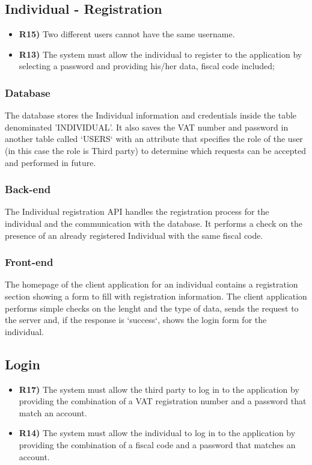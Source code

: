 \subsection{Individual - Registration}
\begin{itemize}
	\item {\color{Green}\textbf{R15)}} Two different users cannot have the same username.
	\item {\color{Green}\textbf{R13)}} The system must allow the individual to register to the application by selecting a password and providing his/her data, fiscal code included;
\end{itemize}

\subsubsection*{Database}
The database stores the Individual information and credentials inside the table denominated 'INDIVIDUAL'. It also saves the VAT number and password in another table called `USERS` with an attribute that specifies the role of the user (in this case the role is Third party) to determine which requests can be accepted and performed in future.\\

\subsubsection*{Back-end} 
The Individual registration API handles the registration process for the individual and the communication with the database. It performs a check on the presence of an already registered Individual with the same fiscal code.

\subsubsection*{Front-end}
The homepage of the client application for an individual contains a registration section showing a form to fill with registration information. The client application performs simple checks on the lenght and the type of data, sends the request to the server and, if the response is `success`,  shows the login form for the individual.

\subsection{Login}
\begin{itemize}
	\item {\color{Green}\textbf{R17)}} The system must allow the third party to log in to the application by providing the combination of a VAT registration number and a password that match an account.
		\item {\color{ProcessBlue}\textbf{R14)}} The system must allow the individual to log in to the application by providing the combination of a fiscal code and a password that matches an account.
\end{itemize}

